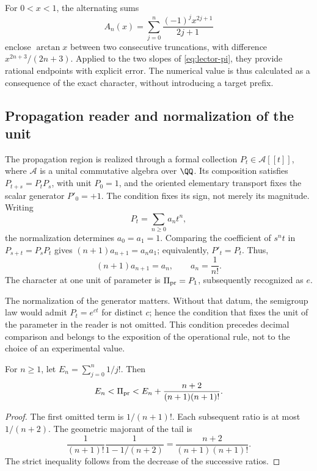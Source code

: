 For \(0<x<1\), the alternating sums
\[
 A_n(x)=\sum_{j=0}^n\frac{(-1)^jx^{2j+1}}{2j+1}
\]
enclose \(\arctan x\) between two consecutive truncations, with difference \(x^{2n+3}/(2n+3)\). Applied to the two slopes of \eqref{eq:lector-pi}, they provide rational endpoints with explicit error. The numerical value is thus calculated as a consequence of the exact character, without introducing a target prefix.

\subsection{Propagation reader and normalization of the unit}

The propagation region is realized through a formal collection \(P_t\in\mathcal A[[t]]\), where \(\mathcal A\) is a unital commutative algebra over \(\QQ\). Its composition satisfies \(P_{t+s}=P_tP_s\), with unit \(P_0=1\), and the oriented elementary transport fixes the scalar generator \(P'_0=+1\). The condition fixes its sign, not merely its magnitude. Writing
\[
 P_t=\sum_{n\ge0}a_nt^n,
\]
the normalization determines \(a_0=a_1=1\). Comparing the coefficient of \(s^nt\) in \(P_{s+t}=P_sP_t\) gives \((n+1)a_{n+1}=a_na_1\); equivalently, \(P'_t=P_t\). Thus,
\begin{equation}
 (n+1)a_{n+1}=a_n,\qquad a_n=\frac1{n!}.
 \label{eq:propagacion}
\end{equation}
The character at one unit of parameter is \(\Pi_{\rm pr}=P_1\), subsequently recognized as \(e\).

The normalization of the generator matters. Without that datum, the semigroup law would admit \(P_t=e^{ct}\) for distinct \(c\); hence the condition that fixes the unit of the parameter in the reader is not omitted. This condition precedes decimal comparison and belongs to the exposition of the operational rule, not to the choice of an experimental value.

\begin{proposition}
For \(n\ge1\), let \(E_n=\sum_{j=0}^n1/j!\). Then
\[
 E_n<\Pi_{\rm pr}<E_n+\frac{n+2}{(n+1)(n+1)!}.
\]
\end{proposition}
\begin{proof}
The first omitted term is \(1/(n+1)!\). Each subsequent ratio is at most \(1/(n+2)\). The geometric majorant of the tail is
\[
 \frac1{(n+1)!}\frac1{1-1/(n+2)}
 =\frac{n+2}{(n+1)(n+1)!}.
\]
The strict inequality follows from the decrease of the successive ratios.
\end{proof}


